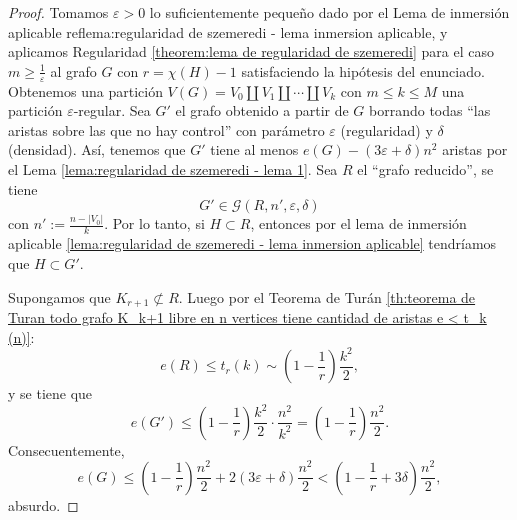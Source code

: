 \documentclass[12pt]{report}
\theoremstyle{plain}
\theoremstyle{definition}
\newcommand{\abs}[1]{\left \vert #1 \right \vert}
\begin{document}
\begin{proof}
Tomamos $\varepsilon > 0$ lo suficientemente pequeño dado por el Lema de inmersión aplicable ref{lema:regularidad de szemeredi - lema inmersion aplicable}, y aplicamos Regularidad \ref{theorem:lema de regularidad de szemeredi} para el caso $m \geq \frac 1 \varepsilon$ al grafo $G$ con $r = \chi (H) -1$ satisfaciendo la hipótesis del enunciado. Obtenemos una partición $V(G) = V_0 \coprod V_1 \coprod \cdots \coprod V_k$ con $m \leq k \leq M$ una partición $\varepsilon$-regular. Sea $G'$ el grafo obtenido a partir de $G$ borrando todas ``las aristas sobre las que no hay control'' con parámetro $\varepsilon$ (regularidad) y $\delta$ (densidad). Así, tenemos que $G'$ tiene al menos $e(G) - (3 \varepsilon + \delta) n^2$ aristas por el Lema \ref{lema:regularidad de szemeredi - lema 1}. Sea $R$ el ``grafo reducido'', se tiene
\[
    G' \in \mathcal G (R, n', \varepsilon , \delta)
\]
con $n' := \frac{n - \abs{V_0}}{k}$. Por lo tanto, si $H \subset R$, entonces por el lema de inmersión aplicable \ref{lema:regularidad de szemeredi - lema inmersion aplicable} tendríamos que $H \subset G'$.

Supongamos que $K_{r+1} \not \subset R$. Luego por el Teorema de Turán \ref{th:teorema de Turan todo grafo K_k+1 libre en n vertices tiene cantidad de aristas e < t_k (n)}:
\[
    e(R) \leq t_r (k) \sim  \left (1 - \frac 1 r \right ) \frac{k^2}{2},
\]
y se tiene que
\[
    e(G') \leq \left ( 1 - \frac 1 r \right ) \frac{k^2}{2} \cdot \frac{n^2}{k^2} = \left (1 - \frac 1 r \right ) \frac{n^2}{2}.
\]
Consecuentemente,
\[
    e(G) \leq \left ( 1 - \frac 1 r \right )\frac{n^2}{2} + 2(3 \varepsilon +\delta)\frac{n^2}{2} < \left ( 1 - \frac 1 r + 3 \delta \right ) \frac{n^2}{2},
\]
absurdo.
\end{proof}


































%





\newpage


{}
\end{document}
